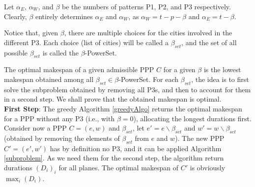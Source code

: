 \documentclass{llncs}
\begin{document}
Let $\alpha_E$,  $\alpha_W$, and $\beta$ be the numbers of patterns P1, P2, and P3 respectively. Clearly, $\beta$ entirely determines $\alpha_E$ and  $\alpha_W$, as $\alpha_W = t-p-\beta$ and $\alpha_E = t - \beta$.

Notice that, given $\beta$, there are multiple choices for the cities involved in the different P3. Each choice (list of cities) will be called a $\beta_{set}$, and the set of all possible $\beta_{set}$ is called the $\beta$-PowerSet. 


The optimal makespan of a given admissible PPP $C$ for a given $\beta$ is the lowest makespan obtained among all $\beta_{set} \in \beta$-PowerSet. For each $\beta_{set}$, the idea is to first solve the subproblem obtained by removing all P3s, and then to account for them in a second step. 
We shall prove that the obtained makespan is optimal.\\

\noindent
{\bf First Step}: The greedy Algorithm \ref{greedyAlgo} returns the optimal makespan for a PPP without any P3 (i.e., with $\beta = 0$), allocating the longest durations first.
Consider now a PPP $C = (e,w)$ and $\beta_{set}$, let $e' = e \backslash \beta_{set}$  and $w' = w \backslash \beta_{set}$ (obtained by removing the elements of $\beta_{set}$ from $e$ and $w$). The new PPP $C'=(e',w')$ has by definition no P3, and it can be applied Algorithm \ref{subproblem}. As we need them for the second step, the algorithm return durations $(D_i)_i$ for all planes. The optimal makespan of $C'$ is obviously $\max_i(D_i)$.
\end{document}
